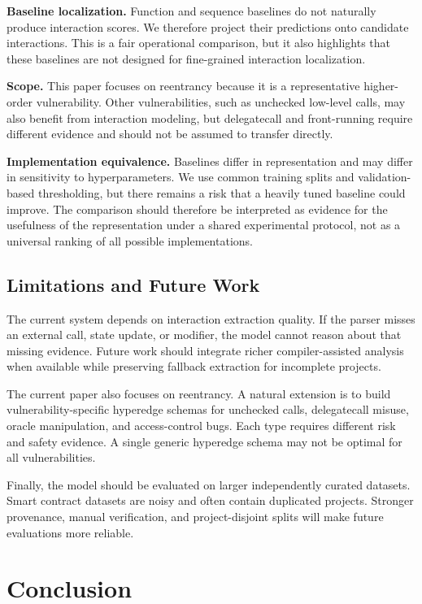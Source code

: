 \documentclass[conference]{IEEEtran}
\begin{document}
\textbf{Baseline localization.} Function and sequence baselines do not naturally produce interaction scores. We therefore project their predictions onto candidate interactions. This is a fair operational comparison, but it also highlights that these baselines are not designed for fine-grained interaction localization.

\textbf{Scope.} This paper focuses on reentrancy because it is a representative higher-order vulnerability. Other vulnerabilities, such as unchecked low-level calls, may also benefit from interaction modeling, but delegatecall and front-running require different evidence and should not be assumed to transfer directly.

\textbf{Implementation equivalence.} Baselines differ in representation and may differ in sensitivity to hyperparameters. We use common training splits and validation-based thresholding, but there remains a risk that a heavily tuned baseline could improve. The comparison should therefore be interpreted as evidence for the usefulness of the representation under a shared experimental protocol, not as a universal ranking of all possible implementations.

\subsection{Limitations and Future Work}

The current system depends on interaction extraction quality. If the parser misses an external call, state update, or modifier, the model cannot reason about that missing evidence. Future work should integrate richer compiler-assisted analysis when available while preserving fallback extraction for incomplete projects.

The current paper also focuses on reentrancy. A natural extension is to build vulnerability-specific hyperedge schemas for unchecked calls, delegatecall misuse, oracle manipulation, and access-control bugs. Each type requires different risk and safety evidence. A single generic hyperedge schema may not be optimal for all vulnerabilities.

Finally, the model should be evaluated on larger independently curated datasets. Smart contract datasets are noisy and often contain duplicated projects. Stronger provenance, manual verification, and project-disjoint splits will make future evaluations more reliable.

\section{Conclusion}
\end{document}
